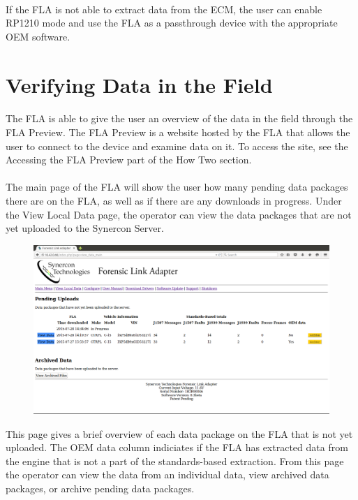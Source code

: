 \documentclass[11pt]{article}
\begin{document}
\paragraph{  }
If the FLA is not able to extract data from the ECM, the user can enable RP1210 mode and use the FLA as a passthrough device with the appropriate OEM software.

\section{Verifying Data in the Field}
\paragraph{  }
The FLA is able to give the user an overview of the data in the field through the FLA Preview. The FLA Preview is a website hosted by the FLA that allows the user to connect to the device and examine data on it. To access the site, see the Accessing the FLA Preview part of the How Two section.
\paragraph{}
The main page of the FLA will show the user how many pending data packages there are on the FLA, as well as if there are any downloads in progress. Under the View Local Data page, the operator can view the data packages that are not yet uploaded to the Synercon Server.
\begin{figure}[tbph]
\centering
\includegraphics[width=1\linewidth]{../media/fla_preview_screenshots/local_data}
\label{fig:fla_preview_local_data}
\caption{}
\end{figure}
This page gives a brief overview of each data package on the FLA that is not yet uploaded. The OEM data column indiciates if the FLA has extracted data from the engine that is not a part of the standards-based extraction. From this page the operator can view the data from an individual data, view archived data packages, or archive pending data packages.
\end{document}
